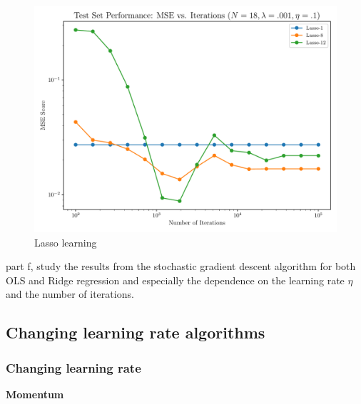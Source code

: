 \documentclass[amssymb,twocolumn,aps]{revtex4}
\begin{document}
\begin{figure}[h]
    \centering
    \includegraphics[width=.95 \linewidth]{Figures/Lasso_MSE.pdf}
    \caption{Lasso learning}
    \label{fig:Lasso1}
\end{figure}


part f, study the results from the stochastic gradient descent algorithm for both OLS and Ridge regression and especially the dependence on the learning rate $\eta$ and the number of iterations.

\subsection{Changing learning rate algorithms}

\subsubsection{Changing learning rate}

\textbf{Momentum}
\end{document}

